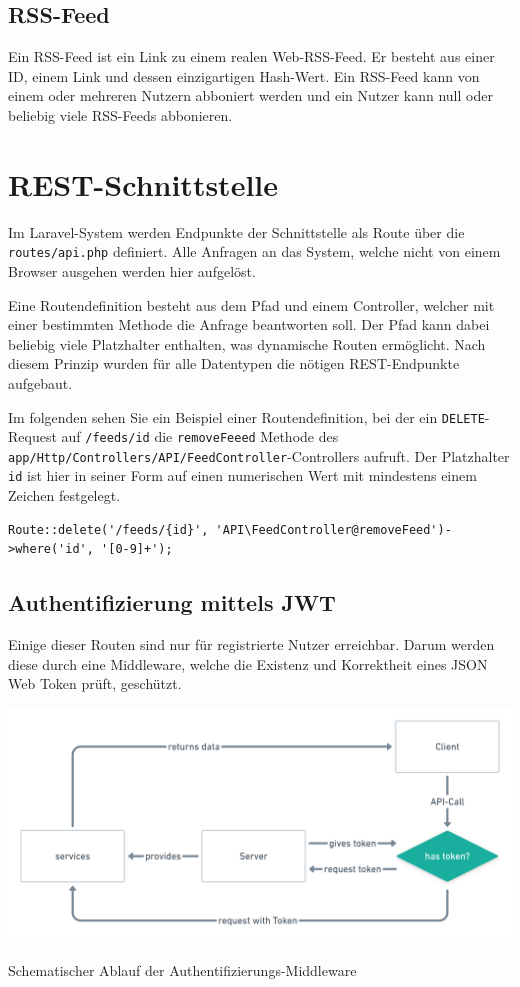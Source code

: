     \subsection{RSS-Feed}
        Ein RSS-Feed ist ein Link zu einem realen Web-RSS-Feed. Er besteht aus einer ID, einem Link und dessen einzigartigen Hash-Wert. Ein RSS-Feed kann von einem oder mehreren Nutzern abboniert werden und ein Nutzer kann null oder beliebig viele RSS-Feeds abbonieren.
    

\section{REST-Schnittstelle}

    Im Laravel-System werden Endpunkte der Schnittstelle als Route über die \texttt{routes/api.php} definiert. Alle Anfragen an das System, welche nicht von einem Browser ausgehen werden hier aufgelöst.
    
    Eine Routendefinition besteht aus dem Pfad und einem Controller, welcher mit einer bestimmten Methode die Anfrage beantworten soll. Der Pfad kann dabei beliebig viele Platzhalter enthalten, was dynamische Routen ermöglicht. Nach diesem Prinzip wurden für alle Datentypen die nötigen REST-Endpunkte aufgebaut.
    
    Im folgenden sehen Sie ein Beispiel einer Routendefinition, bei der ein \texttt{DELETE}-Request auf \texttt{/feeds/{id}} die \texttt{removeFeeed} Methode des \texttt{app/Http/Controllers/API/FeedController}-Controllers aufruft. Der Platzhalter \texttt{{id}} ist hier in seiner Form auf einen numerischen Wert mit mindestens einem Zeichen festgelegt.

    \begin{lstlisting}
Route::delete('/feeds/{id}', 'API\FeedController@removeFeed')->where('id', '[0-9]+');
    \end{lstlisting}
    
    \subsection{Authentifizierung mittels JWT}
        Einige dieser Routen sind nur für registrierte Nutzer erreichbar. Darum werden diese durch eine Middleware, welche die Existenz und Korrektheit eines JSON Web Token prüft, geschützt. 
        
        \begin{center}
            \includegraphics[width=\textwidth]{images/collector-jwt-auth-process.png}
            \caption{Schematischer Ablauf der Authentifizierungs-Middleware}
        \end{center}
        
